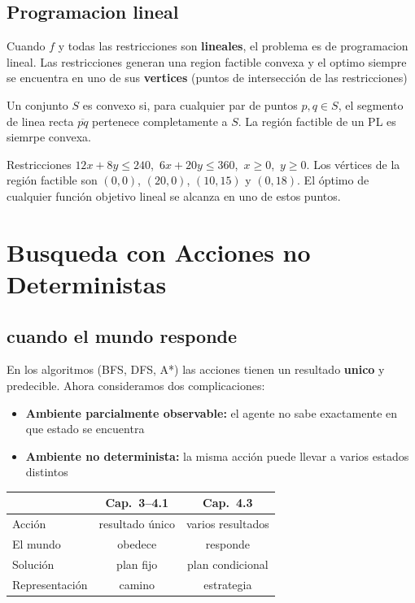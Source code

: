\subsection{Programacion lineal}
Cuando $f$ y todas las restricciones son \textbf{lineales}, el problema es de programacion lineal. Las restricciones generan una region factible convexa y el optimo siempre se encuentra en 
uno de sus \textbf{vertices} (puntos de intersección de las restricciones)

\begin{definition}
    Un conjunto $S$ es convexo si, para cualquier par de puntos $p, q \in S$, el segmento de linea recta $\overline{pq}$ pertenece completamente a $S$. La región factible de un PL es siemrpe convexa.
    
\end{definition}

\begin{example}
  Restricciones $12x + 8y \leq 240$, $\,6x + 20y \leq 360$,
  $\,x \geq 0$, $\,y \geq 0$. Los vértices de la región factible son
  $(0,0)$, $(20,0)$, $(10,15)$ y $(0,18)$. El óptimo de cualquier
  función objetivo lineal se alcanza en uno de estos puntos.
\end{example}


\section{Busqueda con Acciones no Deterministas}
\subsection{cuando el mundo responde}
En los algoritmos (BFS, DFS, A*) las acciones tienen un resultado \textbf{unico} y predecible. Ahora consideramos dos complicaciones:
\begin{itemize}
    \item \textbf{Ambiente parcialmente observable:} el agente no sabe exactamente en que estado se encuentra
    \item \textbf{Ambiente no determinista:} la misma acción puede llevar a varios estados distintos
\end{itemize}

 
\begin{center}
    \begin{tabular}{lcc}
      \toprule
      & Cap.\ 3--4.1 & Cap.\ 4.3 \\
      \midrule
      Acción       & resultado único & varios resultados \\
      El mundo     & obedece         & responde          \\
      Solución     & plan fijo       & plan condicional  \\
      Representación & camino        & estrategia        \\
      \bottomrule
    \end{tabular}
    \end{center}

